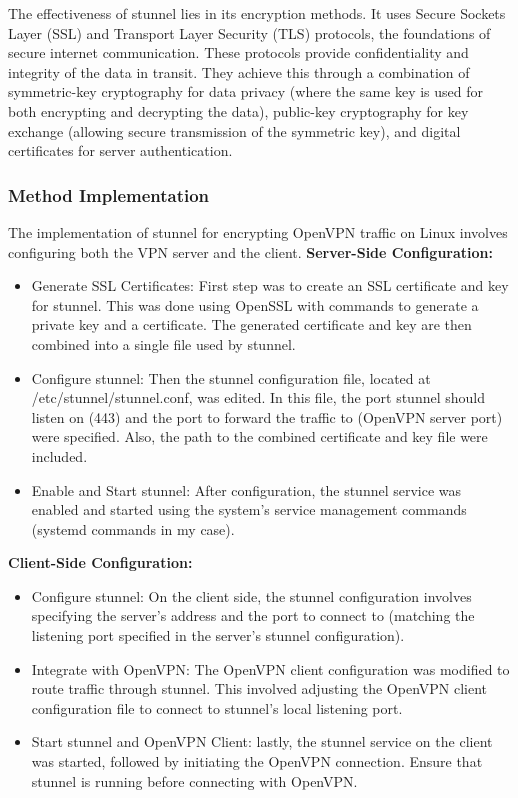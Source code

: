 \documentclass[12pt, fleqn, a4paper]{article}
\begin{document}
The effectiveness of stunnel lies in its encryption methods. It uses Secure Sockets Layer (SSL) and Transport Layer Security (TLS) protocols, the foundations of secure internet communication. These protocols provide confidentiality and integrity of the data in transit. They achieve this through a combination of symmetric-key cryptography for data privacy (where the same key is used for both encrypting and decrypting the data), public-key cryptography for key exchange (allowing secure transmission of the symmetric key), and digital certificates for server authentication.
\subsubsection{Method Implementation}
The implementation of stunnel for encrypting OpenVPN traffic on Linux involves configuring both the VPN server and the client. 
\noindent \textbf{Server-Side Configuration:}
\begin{itemize}
\item Generate SSL Certificates: First step was to create an SSL certificate and key for stunnel. This was done using OpenSSL with commands to generate a private key and a certificate. The generated certificate and key are then combined into a single file used by stunnel.
\item Configure stunnel: Then the stunnel configuration file, located at /etc/stunnel/stunnel.conf, was edited. In this file, the port stunnel should listen on (443) and the port to forward the traffic to (OpenVPN server port) were specified. Also, the path to the combined certificate and key file were included.
\item Enable and Start stunnel: After configuration, the stunnel service was enabled and started using the system's service management commands (systemd commands in my case).
\end{itemize}

\noindent \textbf{Client-Side Configuration:}
\begin{itemize}
\item Configure stunnel: On the client side, the stunnel configuration involves specifying the server's address and the port to connect to (matching the listening port specified in the server's stunnel configuration). 
\item Integrate with OpenVPN: The OpenVPN client configuration was modified to route traffic through stunnel. This involved adjusting the OpenVPN client configuration file to connect to stunnel's local listening port.
\item Start stunnel and OpenVPN Client: lastly, the stunnel service on the client was started, followed by initiating the OpenVPN connection. Ensure that stunnel is running before connecting with OpenVPN.
\end{itemize}
\end{document}
